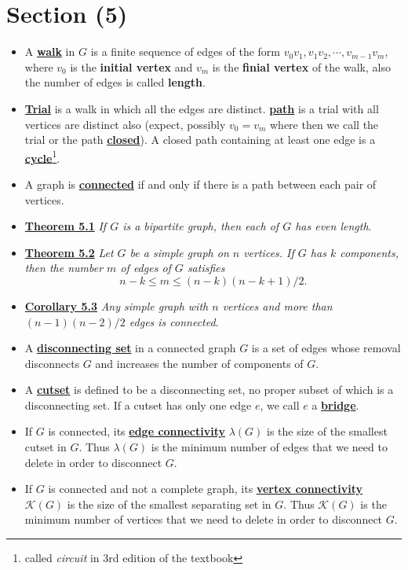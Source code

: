 \documentclass[12pt,a4paper, twocolumn]{article}
\begin{document}
\section*{Section (5)}
\begin{itemize}
		\item A \underline{\textbf{walk}} in $G$ is a finite sequence of edges of the form $v_0 v_1, v_1 v_2, \cdots, v_{m-1} v_m$, where $v_0$ is the \textbf{initial vertex} and $v_m$ is the \textbf{finial vertex} of the walk, also the number of edges is called \textbf{length}.
		\item \underline{\textbf{Trial}} is a walk in which all the edges are distinct. \underline{\textbf{path}} is a trial with all vertices are distinct also (expect, possibly $v_0 = v_m$ where then we call the trial or the path \underline{\textbf{closed}}). A closed path containing at least one edge is a \underline{\textbf{cycle}}\footnote{called \emph{circuit} in 3rd edition of the textbook}.
		\item A graph is \underline{\textbf{connected}} if and only if there is a path between each pair of vertices.
		\item \underline{\textbf{Theorem 5.1}} \emph{If $G$ is a bipartite graph, then each of $G$ has even length}.
		\item \underline{\textbf{Theorem 5.2}} \emph{Let $G$ be a simple graph on $n$ vertices. If $G$ has $k$ components, then the number $m$ of edges of $G$ satisfies}
				\begin{equation}
						n-k \leq m \leq (n-k)(n-k+1)/2.
				\end{equation}
		\item \underline{\textbf{Corollary 5.3}} \emph{Any simple graph with $n$ vertices and more than $(n-1)(n-2)/2$ edges is connected}.
		\item A \underline{\textbf{disconnecting set}} in a connected graph $G$ is a set of edges whose removal disconnects $G$ and increases the number of components of $G$.
		\item A \underline{\textbf{cutset}} is defined to be a disconnecting set, no proper subset of which is a disconnecting set. If a cutset has only one edge $e$, we call $e$ a \underline{\textbf{bridge}}.
		\item If $G$ is connected, its \underline{\textbf{edge connectivity}} $\lambda (G)$ is the size of the smallest cutset in $G$. Thus $\lambda (G)$ is the minimum number of edges that we need to delete in order to disconnect $G$.
		\item If $G$ is connected and not a complete graph, its \underline{\textbf{vertex connectivity}} $\mathcal{K}(G)$ is the size of the smallest separating set in $G$. Thus $\mathcal{K}(G)$ is the minimum number of vertices that we need to delete in order to disconnect $G$.
\end{itemize}
\end{document}
